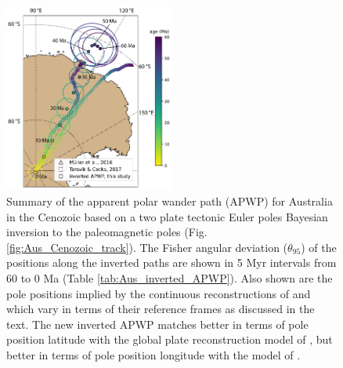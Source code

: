 \documentclass[11pt,letterpaper]{article}
\begin{document}
\begin{figure}
\centering
\includegraphics[width=0.5\textwidth]{fig_aus_predicted_APWP.pdf}
\caption{Summary of the apparent polar wander path (APWP) for Australia in the Cenozoic based on a two plate tectonic Euler poles Bayesian inversion to the paleomagnetic poles (Fig. \ref{fig:Aus_Cenozoic_track}). The Fisher angular deviation ($\theta_{95}$) of the positions along the inverted paths are shown in 5 Myr intervals from 60 to 0 Ma (Table \ref{tab:Aus_inverted_APWP}). Also shown are the pole positions implied by the continuous reconstructions of \cite{Muller2016a} and \cite{Torsvik2017a} which vary in terms of their reference frames as discussed in the text. The new inverted APWP matches better in terms of pole position latitude with the global plate reconstruction model of \cite{Muller2016a}, but better in terms of pole position longitude with the model of \cite{Torsvik2017a}.}
\label{fig:Aus_inverted_APWP}
\end{figure}
\end{document}
